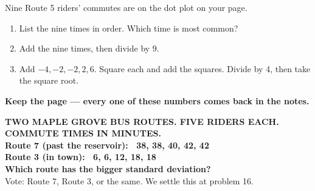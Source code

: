\documentclass[aspectratio=169, 11pt]{beamer}
\begin{document}
\begin{frame}[t, plain]
  \vspace{0.3cm}
  \begin{center}
    \begin{minipage}{0.86\textwidth}
      Nine Route 5 riders' commutes are on the dot plot on your page.
      \begin{enumerate}\setlength{\itemsep}{7pt}
        \item List the nine times in order. Which time is most common?
        \item Add the nine times, then divide by 9.
        \item Add $-4, -2, -2, 2, 6$. Square each and add the squares. Divide by 4, then take
              the square root.
      \end{enumerate}
    \end{minipage}
  \end{center}
  \vspace{0.4cm}
  \begin{center}
    {\color{cerulean}\bfseries Keep the page --- every one of these numbers comes back in the notes.}
  \end{center}
\end{frame}

{
\begin{frame}[plain]
  \vspace{1.1cm}
  \begin{center}
    {\color{frostmid}\bfseries\small TWO MAPLE GROVE BUS ROUTES. FIVE RIDERS EACH. COMMUTE TIMES IN MINUTES.}\\[0.7cm]
    {\color{white}\bfseries\Large Route 7 (past the reservoir): \ 38, 38, 40, 42, 42}\\[0.35cm]
    {\color{white}\bfseries\Large Route 3 (in town): \ 6, 6, 12, 18, 18}\\[0.8cm]
    {\color{goldacc}\bfseries\large Which route has the bigger standard deviation?}\\[0.5cm]
    {\color{frostmid}\small Vote: Route 7, Route 3, or the same. We settle this at problem 16.}
  \end{center}
\end{frame}
}
\end{document}
